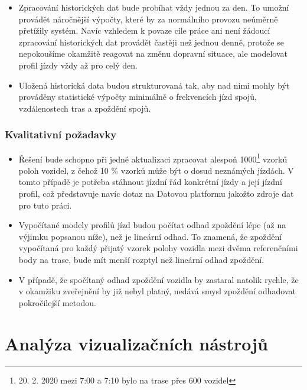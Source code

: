 \begin{itemize}
\item


Zpracování historických dat bude probíhat vždy jednou za den. To umožní provádět náročnější výpočty, které by za normálního provozu neúměrně přetížily systém. Navíc vzhledem k povaze cíle práce ani není žádoucí zpracování historických dat provádět častěji než jednou denně, protože se nepokoušíme okamžitě reagovat na změnu dopravní situace, ale modelovat profil jízdy vždy až pro celý den.


\item


Uložená historická data budou strukturovaná tak, aby nad nimi mohly být prováděny statistické výpočty minimálně o frekvencích jízd spojů, vzdálenostech tras a zpoždění spojů.
\end{itemize}


\subsubsection{Kvalitativní požadavky} \label{subsubsection:kvalitativni_pozadavky}


\begin{itemize}


\item
Řešení bude schopno při jedné aktualizaci zpracovat alespoň 1000\footnote{20. 2. 2020 mezi 7:00 a 7:10 bylo na trase přes 600 vozidel} vzorků poloh vozidel, z čehož 10 \% vzorků může být o dosud neznámých jízdách. V tomto případě je potřeba stáhnout jízdní řád konkrétní jízdy a její jízdní profil, což představuje navíc dotaz na Datovou platformu jakožto zdroje dat pro tuto práci.


\item
Vypočítané modely profilů jízd budou počítat odhad zpoždění lépe (až na výjimku popsanou níže), než je lineární odhad. To znamená, že zpoždění vypočítaná pro každý přijatý vzorek polohy vozidla mezi dvěma referenčními body na trase, bude mít menší rozptyl než lineární odhad zpoždění.


\item
V případě, že spočítaný odhad zpoždění vozidla by zastaral natolik rychle, že v okamžiku zveřejnění by již nebyl platný, nedává smysl zpoždění odhadovat pokročilejší metodou.


\end{itemize}

\section{Analýza vizualizačních nástrojů}

